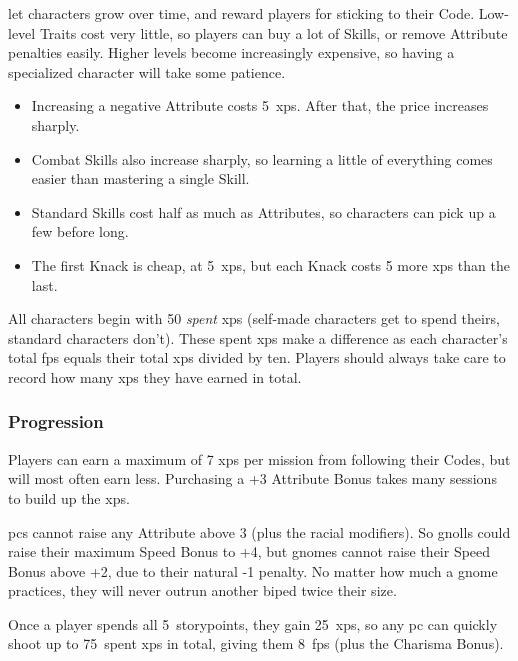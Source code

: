 \begin{multicols}{2}


\noindent
{} let characters grow over time, and reward players for sticking to their Code.
Low-level Traits cost very little, so players can buy a lot of Skills, or remove Attribute penalties easily.
Higher levels become increasingly expensive, so having a specialized character will take some patience.

\begin{itemize}
  \item
  Increasing a negative Attribute costs 5~\glspl{xp}.
  After that, the price increases sharply.
  \item
  Combat Skills also increase sharply, so learning a little of everything comes easier than mastering a single Skill.
  \item
  Standard Skills cost half as much as Attributes, so characters can pick up a few before long.
  \item
  The first Knack is cheap, at 5~\glspl{xp}, but each Knack costs 5 more \glspl{xp} than the last.
\end{itemize}

All characters begin with 50 \textit{spent} \glspl{xp}
(self-made characters get to spend theirs, standard characters don't).
These spent \glspl{xp} make a difference as each character's total \glspl{fp} equals their total \glspl{xp} divided by ten.
Players should always take care to record how many \glspl{xp} they have earned in total.

\subsubsection{Progression}

Players can earn a maximum of 7 \glspl{xp} per mission from following their Codes, but will most often earn less.
Purchasing a +3 Attribute Bonus takes many sessions to build up the \glspl{xp}.


\label{racial_limits}
\Glspl{pc} cannot raise any Attribute above 3 (plus the racial modifiers).
So gnolls could raise their maximum Speed Bonus to +4, but gnomes cannot raise their Speed Bonus above +2, due to their natural -1 penalty.
No matter how much a gnome practices, they will never outrun another biped twice their size.

Once a player spends all 5~\glspl{storypoint}, they gain 25~\glspl{xp}, so any \gls{pc} can quickly shoot up to 75~spent \glspl{xp} in total, giving them 8~\glspl{fp} (plus the Charisma Bonus).


\end{multicols}
